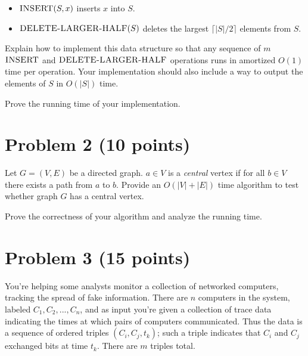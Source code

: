 \documentclass[letterpaper, 11pt]{article}
\begin{document}
\begin{itemize}
\item $\textsc{INSERT}(S,x)$ inserts $x$ into $S$.
\item $\textsc{DELETE-LARGER-HALF}(S)$ deletes the largest $\lceil{|S|/2}\rceil$ elements from $S$.
\end{itemize}
Explain how to implement this data structure so that any sequence of $m$ $\textsc{INSERT}$ and $\textsc{DELETE-LARGER-HALF}$ operations runs in amortized $O(1)$ time per operation. Your implementation should also include a way to output the elements of $S$ in $O(|S|)$ time.

Prove the running time of your implementation.












\section{Problem 2 (10 points)}
Let $G = (V, E)$ be a directed graph. $a\in V$ is a \emph{central} vertex if for all $b\in V$ there exists a path from $a$ to $b$. 
Provide an $O(|V| + |E|)$ time algorithm to test whether graph $G$ has a central vertex.

Prove the correctness of your algorithm and analyze the running time.





\section{Problem 3 (15 points)}
You're helping some analysts monitor a collection of networked
computers, tracking the spread of fake information. There are $n$ computers
in the system, labeled $C_1, C_2,..., C_n$, and as input you're given a collection
of trace data indicating the times at which pairs of computers communicated. Thus the data is a sequence of ordered triples $(C_i, C_j, t_k)$; such a
triple indicates that $C_i$ and $C_j$ exchanged bits at time $t_k$. There are $m$ triples total.
\end{document}
